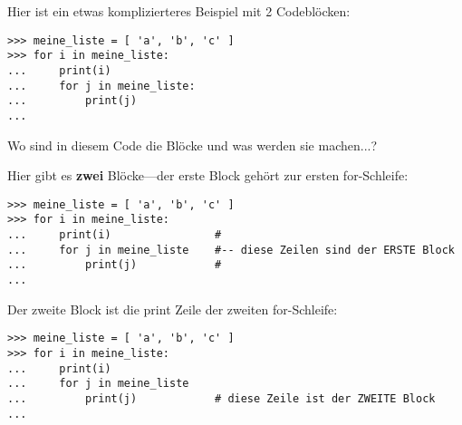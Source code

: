 \par
Hier ist ein etwas komplizierteres Beispiel mit 2 Codeblöcken:

\begin{Verbatim}[frame=single]
>>> meine_liste = [ 'a', 'b', 'c' ]
>>> for i in meine_liste:
...     print(i)
...     for j in meine_liste:
...         print(j)
...
\end{Verbatim}

\noindent
Wo sind in diesem Code die Blöcke und was werden sie machen...?
\par
\noindent
Hier gibt es \textbf{zwei} Blöcke---der erste Block gehört zur ersten for-Schleife:

\begin{Verbatim}[frame=single]
>>> meine_liste = [ 'a', 'b', 'c' ]
>>> for i in meine_liste:
...     print(i)                #
...     for j in meine_liste    #-- diese Zeilen sind der ERSTE Block
...         print(j)            #
...
\end{Verbatim}


Der zweite Block ist die print Zeile der zweiten for-Schleife:

\begin{Verbatim}[frame=single]
>>> meine_liste = [ 'a', 'b', 'c' ]
>>> for i in meine_liste:
...     print(i)
...     for j in meine_liste
...         print(j)            # diese Zeile ist der ZWEITE Block
...
\end{Verbatim}

